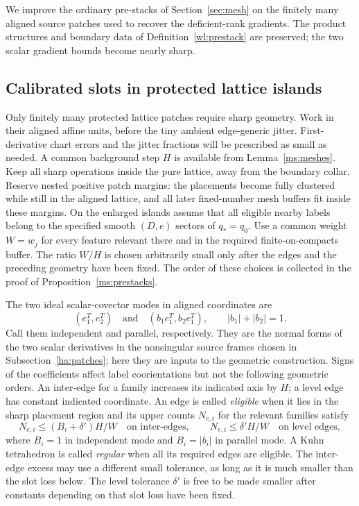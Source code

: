 \documentclass[11pt]{article}
\numberwithin{equation}{section}
\theoremstyle{definition}
\theoremstyle{remark}
\begin{document}
We improve the ordinary pre-stacks of Section~\ref{sec:mesh} on the
finitely many aligned source patches used to recover the deficient-rank
gradients.  The product structures and boundary data of
Definition~\ref{wl:prestack} are preserved; the two scalar gradient
bounds become nearly sharp.

\subsection{Calibrated slots in protected lattice islands}

Only finitely many protected lattice patches require sharp geometry.
Work in their aligned affine units, before the tiny ambient
edge-generic jitter.  First-derivative chart errors and the jitter
fractions will be prescribed as small as needed.  A common background
step $H$ is available from Lemma~\ref{ms:meshes}.  Keep all sharp operations
inside the pure lattice, away from the boundary collar.  Reserve nested
positive patch margins: the placements become fully clustered while
still in the aligned lattice, and all later fixed-number mesh buffers
fit inside these margins.  On the enlarged islands assume that all
eligible nearby labels belong to the specified smooth $(D,e)$ sectors
of $q_*=q_0$.  Use a common weight $W=w_j$ for every feature relevant
there and in the required finite-on-compacts buffer.  The ratio $W/H$
is chosen arbitrarily small only after the edges and the preceding
geometry have been fixed.  The order of these choices is collected in
the proof of Proposition~\ref{ms:prestacks}.

The two ideal scalar-covector modes in aligned coordinates are
\begin{equation}
 (e_1^T,e_2^T)
 \quad\text{and}\quad
 (b_1e_1^T,b_2e_1^T),\qquad |b_1|+|b_2|=1.
 \label{ms:modes}
\end{equation}
Call them independent and parallel, respectively.  They are the
normal forms of the two scalar derivatives in the nonsingular source
frames chosen in Subsection~\ref{ha:patches}; here they are inputs to
the geometric construction.  Signs of the coefficients affect label
coorientations but not the following geometric orders.  An inter-edge
for a family increases its indicated
axis by $H$; a level edge has constant indicated coordinate.  An edge
is called \emph{eligible} when it lies in the sharp placement region
and its upper counts $N_{e,i}$ for the relevant families satisfy
\begin{equation}
 N_{e,i}\le (B_i+\delta')H/W\quad\text{on inter-edges},
 \qquad
 N_{e,i}\le\delta'H/W\quad\text{on level edges},
 \label{ms:regular-counts}
\end{equation}
where $B_i=1$ in independent mode and $B_i=|b_i|$ in parallel mode.
A Kuhn tetrahedron is called \emph{regular} when all its required
edges are eligible.
The inter-edge excess may use a different small tolerance, as long as
it is much smaller than the slot loss below.  The level tolerance
$\delta'$ is free to be made smaller after constants depending on
that slot loss have been fixed.
\end{document}

